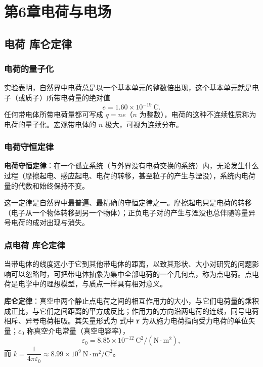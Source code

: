 \chapter{第6章\texorpdfstring{\hspace{0.5em}}{ }电荷与电场}

\section{电荷 库仑定律}
    \subsection{电荷的量子化}
    实验表明，自然界中电荷总是以一个基本单元的整数倍出现，这个基本单元就是电子（或质子）所带电荷量的绝对值
    \[
    e=1.60\times10^{-19}\ \mathrm{C}.
    \]
    任何带电体所带电荷量都可写成 $q=ne$（$n$ 为整数），电荷的这种不连续性质称为电荷的量子化。宏观带电体的 $n$ 极大，可视为连续分布。

    \subsection{电荷守恒定律}
    \textbf{电荷守恒定律}：在一个孤立系统（与外界没有电荷交换的系统）内，无论发生什么过程（摩擦起电、感应起电、电荷的转移，甚至粒子的产生与湮没），系统内电荷量的代数和始终保持不变。

    这一定律是自然界中最普遍、最精确的守恒定律之一。摩擦起电只是电荷的转移（电子从一个物体转移到另一个物体）；正负电子对的产生与湮没也总伴随等量异号电荷的成对出现与消失。

    \subsection{点电荷 库仑定律}
    当带电体的线度远小于它到其他带电体的距离，以致其形状、大小对研究的问题影响可以忽略时，可把带电体抽象为集中全部电荷的一个几何点，称为点电荷。点电荷是电学中的理想模型，与质点一样具有相对意义。

    \textbf{库仑定律}：真空中两个静止点电荷之间的相互作用力的大小，与它们电荷量的乘积成正比，与它们之间距离的平方成反比；作用力的方向沿两电荷的连线，同号电荷相斥、异号电荷相吸。其矢量形式为
    式中 $\hat{\boldsymbol{r}}$ 为从施力电荷指向受力电荷的单位矢量；$\varepsilon_0$ 称真空介电常量（真空电容率），
    \[
    \varepsilon_0=8.85\times10^{-12}\ \mathrm{C^{2}/(N\cdot m^{2})},
    \]
    而 $k=\dfrac{1}{4\pi\varepsilon_0}\approx 8.99\times10^{9}\ \mathrm{N\cdot m^{2}/C^{2}}$。

